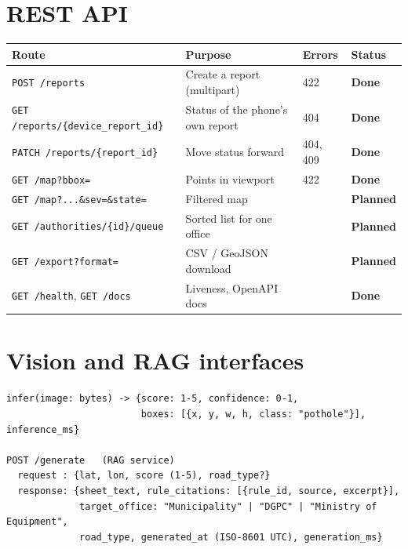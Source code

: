 \documentclass[11pt,a4paper,oneside]{report}
\newcommand{\sDone}{\textcolor{okgreen}{\textbf{Done}}}
\newcommand{\sPlan}{\textcolor{planblue}{\textbf{Planned}}}
\begin{document}
\section{REST API}
\begin{longtable}{@{}L{4.8cm}L{5.4cm}L{2.6cm}L{1.6cm}@{}}
\toprule\textbf{Route} & \textbf{Purpose} & \textbf{Errors} & \textbf{Status}\\\midrule\endhead
\texttt{POST /reports} & Create a report (multipart) & 422 & \sDone\\
\texttt{GET /reports/\{device\_report\_id\}} & Status of the phone's own report & 404 & \sDone\\
\texttt{PATCH /reports/\{report\_id\}} & Move status forward & 404, 409 & \sDone\\
\texttt{GET /map?bbox=} & Points in viewport & 422 & \sDone\\
\texttt{GET /map?...\&sev=\&state=} & Filtered map & & \sPlan\\
\texttt{GET /authorities/\{id\}/queue} & Sorted list for one office & & \sPlan\\
\texttt{GET /export?format=} & CSV / GeoJSON download & & \sPlan\\
\texttt{GET /health}, \texttt{GET /docs} & Liveness, OpenAPI docs & & \sDone\\\bottomrule
\end{longtable}

\section{Vision and RAG interfaces}
\begin{lstlisting}
infer(image: bytes) -> {score: 1-5, confidence: 0-1,
                        boxes: [{x, y, w, h, class: "pothole"}], inference_ms}

POST /generate   (RAG service)
  request : {lat, lon, score (1-5), road_type?}
  response: {sheet_text, rule_citations: [{rule_id, source, excerpt}],
             target_office: "Municipality" | "DGPC" | "Ministry of Equipment",
             road_type, generated_at (ISO-8601 UTC), generation_ms}
\end{lstlisting}
\end{document}
